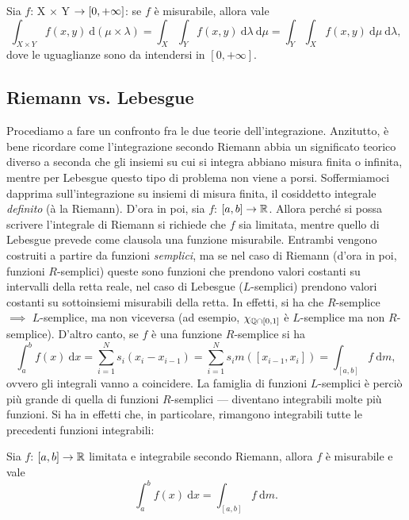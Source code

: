 \documentclass[Completo.tex]{subfiles}
\begin{document}
\begin{Th}
	Sia $f$: X $\times$ Y $\rightarrow [0, +\infty]$: se $f$ è misurabile, allora vale
			\begin{equation*}
	\int_{X \times Y} f(x,y) \ \mathrm{d}(\mu \times \lambda) = \int_X \int_Y f(x,y) \ \mathrm{d}\lambda \ \mathrm{d}\mu = \int_Y \int_X f(x,y) \ \mathrm{d}\mu \ \mathrm{d}\lambda,
	\end{equation*}
	dove le uguaglianze sono da intendersi in $[0, +\infty]$.
\end{Th}
\subsection{Riemann vs. Lebesgue}
Procediamo a fare un confronto fra le due teorie dell'integrazione. Anzitutto, è bene ricordare come l'integrazione secondo Riemann abbia un significato teorico diverso a seconda che gli insiemi su cui si integra abbiano misura finita o infinita, mentre per Lebesgue questo tipo di problema non viene a porsi. Soffermiamoci dapprima sull'integrazione su insiemi di misura finita, il cosiddetto integrale \textit{definito} (à la Riemann). D'ora in poi, sia $f$: $[a,b] \ra \bb[R]$. Allora perché si possa scrivere l'integrale di Riemann si richiede che $f$ sia limitata, mentre quello di Lebesgue prevede come clausola una funzione misurabile. Entrambi vengono costruiti a partire da funzioni \textit{semplici}, ma se nel caso di Riemann (d'ora in poi, funzioni $R$-semplici) queste sono funzioni che prendono valori costanti su intervalli della retta reale, nel caso di Lebesgue ($L$-semplici) prendono valori costanti su sottoinsiemi misurabili della retta. In effetti, si ha che $R$-semplice $\implies$ $L$-semplice, ma non viceversa (ad esempio, $\chi_{\bb[Q] \cap [0,1]}$ è $L$-semplice ma non $R$-semplice). D'altro canto, se $f$ è una funzione $R$-semplice si ha
\begin{equation*}
	\int_{a}^{b} f(x) \ \mathrm{d}x = \sum_{i=1}^{N} s_i (x_i - x_{i-1}) = \sum_{i=1}^{N} s_i m([x_{i-1}, x_i]) = \int_{[a,b]} f \ \mathrm{d}m, 
\end{equation*}
ovvero gli integrali vanno a coincidere. La famiglia di funzioni $L$-semplici è perciò più grande di quella di funzioni $R$-semplici --- diventano integrabili molte più funzioni. Si ha in effetti che, in particolare, rimangono integrabili tutte le precedenti funzioni integrabili:
\begin{eTh}
	Sia $f$: $[a,b] \ra \bb[R]$ limitata e integrabile secondo Riemann, allora $f$ è misurabile e vale
	\begin{equation*}
	\int_{a}^{b} f(x) \ \mathrm{d}x = \int_{[a,b]} f \ \mathrm{d}m.
	\end{equation*}
\end{eTh}
\end{document}
